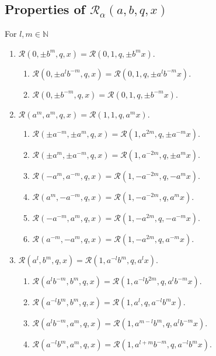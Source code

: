 \documentclass[12pt]{article}
\numberwithin{equation}{section}
\begin{document}
\subsection{Properties of  $\mathcal{R}_\alpha(a,b,q,x)$}
For $l, m\in\mathbb{N}$
\begin{enumerate}
\item $\mathcal{R}\left(0,\pm b^m,q,x\right) =  \mathcal{R}\left(0,1,q,\pm b^mx\right)$.
\begin{enumerate}
\item $\mathcal{R}\left(0,\pm a^{l}b^{-m},q,x\right) =  \mathcal{R}\left(0,1,q,\pm a^{l}b^{-m}x\right)$.
\item $\mathcal{R}\left(0,\pm b^{-m},q,x\right) =  \mathcal{R}\left(0,1,q,\pm b^{-m}x\right)$.
\end{enumerate}
\item $\mathcal{R}\left(a^m, a^m,q,x\right) =  \mathcal{R}\left(1,1,q,a^mx\right)$.
\begin{enumerate}
\item $\mathcal{R}\left(\pm a^{-m}, \pm a^m,q, x\right) =  \mathcal{R}\left(1,a^{2m},q,\pm a^{-m}x\right)$.
\item $\mathcal{R}\left(\pm a^m, \pm a^{-m}, q, x\right) =  \mathcal{R}\left(1,a^{-2m},q,\pm a^mx\right)$.
\item $ \mathcal{R}\left(-a^m, a^{-m}, q, x\right) =  \mathcal{R}\left(1,-a^{-2m},q,-a^{m}x\right)$.
\item $ \mathcal{R}\left(a^m, -a^{-m}, q, x\right) =  \mathcal{R}\left(1,-a^{-2m},q,a^{m}x\right)$.
\item $ \mathcal{R}\left(-a^{-m}, a^{m}, q, x\right) =  \mathcal{R}\left(1,-a^{2m},q,-a^{-m}x\right)$.
\item $ \mathcal{R}\left(a^{-m}, -a^{m}, q, x\right) =  \mathcal{R}\left(1,-a^{2m},q,a^{-m}x\right)$.
\end{enumerate}
\item $\mathcal{R}\left(a^l, b^m, q, x\right) =  \mathcal{R}\left(1, a^{-l} b^m,q,a^lx\right)$.
\begin{enumerate}
\item $\mathcal{R}\left(a^l b^{-m}, b^m, q, x\right) =  \mathcal{R}\left(1, a^{-l} b^{2m},q,a^l b^{-m}x\right)$.
\item $\mathcal{R}\left(a^{-l} b^m, b^m, q, x\right) =  \mathcal{R}\left(1, a^l,q,a^{-l} b^{m}x\right)$.
\item $\mathcal{R}\left(a^{l} b^{-m}, a^m, q, x\right) =  \mathcal{R}\left(1, a^{m-l}b^m,q,a^l b^{-m}x\right)$.
\item $\mathcal{R}\left(a^{-l} b^{m}, a^m, q, x\right) =  \mathcal{R}\left(1, a^{l+m}b^{-m},q,a^{-l} b^{m}x\right)$.
\end{enumerate}
\end{enumerate}
\end{document}
